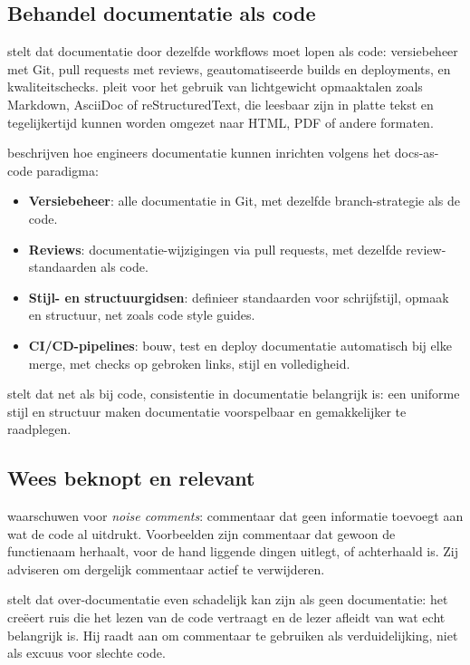 \subsection{Behandel documentatie als code}
\textcite{gentle2017docslikecode} stelt dat documentatie door dezelfde workflows moet lopen als code: versiebeheer met Git, pull requests met reviews, geautomatiseerde builds en deployments, en kwaliteitschecks. \textcite{etter2016moderntechwriting} pleit voor het gebruik van lichtgewicht opmaaktalen zoals Markdown, AsciiDoc of reStructuredText, die leesbaar zijn in platte tekst en tegelijkertijd kunnen worden omgezet naar HTML, PDF of andere formaten.

\textcite{bhatti2021docsdevelopers} beschrijven hoe engineers documentatie kunnen inrichten volgens het docs-as-code paradigma:

\begin{itemize}
    \item \textbf{Versiebeheer}: alle documentatie in Git, met dezelfde branch-strategie als de code.
    \item \textbf{Reviews}: documentatie-wijzigingen via pull requests, met dezelfde review-standaarden als code.
    \item \textbf{Stijl- en structuurgidsen}: definieer standaarden voor schrijfstijl, opmaak en structuur, net zoals code style guides.
    \item \textbf{CI/CD-pipelines}: bouw, test en deploy documentatie automatisch bij elke merge, met checks op gebroken links, stijl en volledigheid.
\end{itemize}

\textcite{martin2008clean} stelt dat net als bij code, consistentie in documentatie belangrijk is: een uniforme stijl en structuur maken documentatie voorspelbaar en gemakkelijker te raadplegen.

\subsection{Wees beknopt en relevant}
\textcite{boswell2011readablecode} waarschuwen voor \textit{noise comments}: commentaar dat geen informatie toevoegt aan wat de code al uitdrukt. Voorbeelden zijn commentaar dat gewoon de functienaam herhaalt, voor de hand liggende dingen uitlegt, of achterhaald is. Zij adviseren om dergelijk commentaar actief te verwijderen.

\textcite{martin2008clean} stelt dat over-documentatie even schadelijk kan zijn als geen documentatie: het creëert ruis die het lezen van de code vertraagt en de lezer afleidt van wat echt belangrijk is. Hij raadt aan om commentaar te gebruiken als verduidelijking, niet als excuus voor slechte code.

